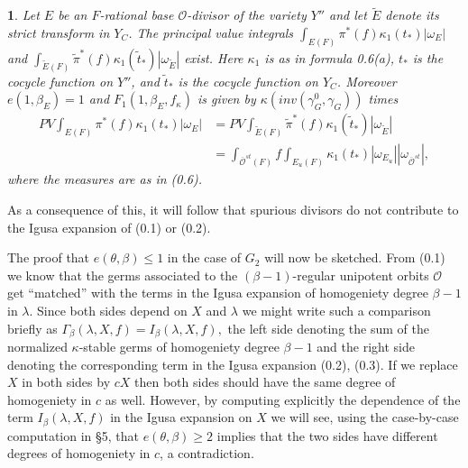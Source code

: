 \documentclass[12pt,letterpaper]{amsart}
\newcommand{\proclaimname}{}
\newtheorem*{proclaimx}{\proclaimname}
\newenvironment{proclaim}[1]%
  {\renewcommand{\proclaimname}{#1}\begin{proclaimx}}{\end{proclaimx}}
\begin{document}
\begin{proclaim}{Lemma 0.8} Let $E$ be an $F$-rational
base ${\mathcal O}$-divisor of the
variety $Y''$ and let $\tilde{E}$ denote its strict transform
in $Y_C$. The principal
value integrals $\int_{{E}(F)}\pi^*(f)\kappa_1(t_*) |\omega_{{E}}|$ and
$\int_{\tilde{E}(F)}\tilde{\pi}^*(f)\kappa_1(\tilde{t}_*) |\omega_{\tilde{E}}|$
exist. Here $\kappa_1$ is as in formula 0.6(a), $t_*$ is the
cocycle function on $Y''$, and $\tilde{t}_*$ is the cocycle function
on $Y_C$. Moreover $e(1,\beta_E)=1$ and
$F_1(1,\beta_E,f_\kappa)$ is given
by $\kappa(inv(\gamma_G^0,\gamma_G))$ times
\[
\begin{split}
PV\int_{{E}(F)}\pi^*(f)\kappa_1(t_*) |\omega_{{E}}|
&=PV\int_{\tilde{E}(F)}\tilde{\pi}^*(f)
\kappa_1(\tilde{t}_*) |\omega_{\tilde{E}}|\\
&=\int_{\overline{\mathcal O}^{st}(F)}
f\int_{{E}_u(F)}\kappa_1(t_*)|\omega_{{E}_u}|
|\omega_{\overline{\mathcal O}^{st}}|,
\end{split}
\]
where the measures are as in (0.6).
\end{proclaim}

As a consequence of this, it will follow that
spurious divisors do not contribute to the Igusa
expansion of (0.1) or (0.2).

The proof that $e(\theta,\beta)\leq 1$ in the case of
$G_2$ will now be sketched. From (0.1) we know that the
germs associated to the
$(\beta -1)$-regular unipotent orbits ${\mathcal O}$ get
``matched'' with the terms in the Igusa expansion of
homogeniety degree $\beta -1$ in $\lambda$. Since both sides depend
on $X$ and $\lambda$ we might write such a comparison briefly
as
$
\Gamma_\beta (\lambda,X,f)=I_\beta(\lambda,X,f),
$
the left side denoting the sum of the normalized $\kappa$-stable
germs of homogeniety degree $\beta -1$ and the right side
denoting the corresponding term in the Igusa expansion
(0.2), (0.3). If we replace $X$ in both sides by $cX$ then both sides
should have the same degree of homogeniety in $c$ as well. However,
by computing explicitly the dependence of the term $I_\beta(\lambda,X,f)$
in the Igusa expansion on $X$ we will see, using the case-by-case
computation in \S 5, that $e(\theta,\beta)\geq 2$ implies that the two sides
have different degrees of homogeniety in $c$, a contradiction.
\end{document}
